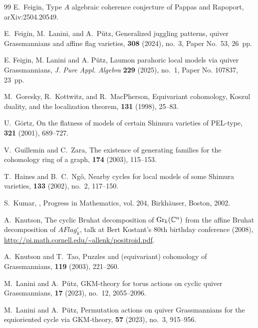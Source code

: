 \documentclass[10pt, a4paper, reqno]{amsart}
\begin{document}
\begin{thebibliography}{99}
	E.~Feigin, {Type $A$ algebraic coherence conjecture of Pappas and Rapoport}, arXiv:2504.20549.
	
	E.~Feigin, M.~Lanini, and A.~P\"utz,
	\newblock Generalized juggling patterns, quiver Grassmannians and affine flag varieties,
	 {\bf 308} (2024), no.~3, Paper No.~53, 26~pp.
	
	E. Feigin, M. Lanini and A. P\"utz, { Laumon parahoric local models via quiver Grassmannians}, {\em J. Pure Appl. Algebra} {\bf 229} (2025), no.~1, Paper No. 107837, 23~pp.
	
	M.~Goresky, R.~Kottwitz, and R.~MacPherson,
	\newblock Equivariant cohomology, Koszul duality, and the localization theorem,
	 {\bf 131} (1998), 25--83.
	
	U.~Görtz,
	\newblock On the flatness of models of certain Shimura varieties of PEL-type,
	 {\bf 321} (2001), 689--727.
	
	V.~Guillemin and C.~Zara,
	\newblock The existence of generating families for the cohomology ring of a graph,
	 {\bf 174} (2003), 115--153.
	
	T.~Haines and B.~C.~Ngô,
	\newblock Nearby cycles for local models of some Shimura varieties,
	 {\bf 133} (2002), no.~2, 117--150.
	
	S.~Kumar,
	,
	\newblock Progress in Mathematics, vol. 204, Birkhäuser, Boston, 2002.
	
	A.~Knutson, { The cyclic Bruhat decomposition of ${\rm Gr}_k(\mathbb{C}^n)$ from the affine Bruhat decomposition of $AFlag_k^\circ$}, 
	talk at Bert Kostant's 80th birthday conference (2008),  \url{http://pi.math.cornell.edu/~allenk/positroid.pdf}.
	
	A.~Knutson and T.~Tao,
	\newblock Puzzles and (equivariant) cohomology of Grassmannians,
	 {\bf 119} (2003), 221--260.
	
	M.~Lanini and A.~P\"utz,
	\newblock GKM-theory for torus actions on cyclic quiver Grassmannians,
	 {\bf 17} (2023), no.~12, 2055--2096.
	
	M.~Lanini and A.~P\"utz,
	\newblock Permutation actions on quiver Grassmannians for the equioriented cycle via GKM-theory,
	 {\bf 57} (2023), no.~3, 915--956.
	

\end{thebibliography}
\end{document}
